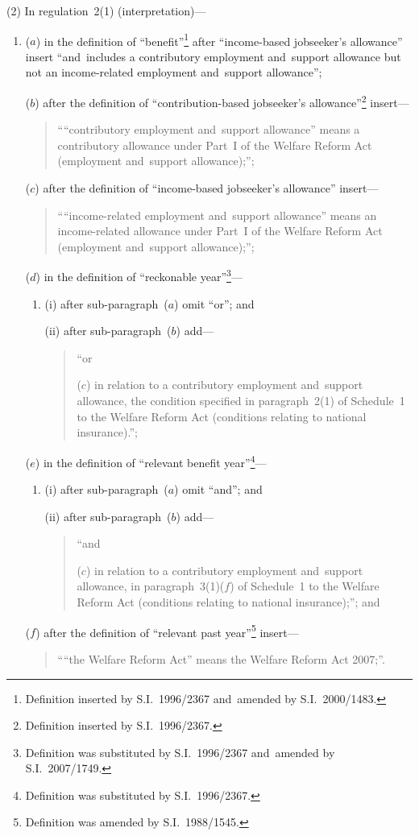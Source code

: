 \documentclass[12pt,a4paper]{article}
\begin{document}
(2) In regulation~2(1) (interpretation)—
\begin{enumerate}\item[]
($a$) in the definition of “benefit”\footnote{Definition inserted by S.I.~1996/2367 and~amended by S.I.~2000/1483.} after “income-based jobseeker’s allowance” insert “and~includes a contributory employment and~support allowance but not an income-related employment and~support allowance”;

($b$) after the definition of “contribution-based jobseeker’s allowance”\footnote{Definition inserted by S.I.~1996/2367.} insert—
\begin{quotation}
““contributory employment and~support allowance” means a contributory allowance under Part~I of the Welfare Reform Act (employment and~support allowance);”;
\end{quotation}

($c$) after the definition of “income-based jobseeker’s allowance” insert—
\begin{quotation}\sloppy
““income-related employment and~support allowance” means an income-related allowance under Part~I of the Welfare Reform Act (employment and~support allowance);”;
\end{quotation}

($d$) in the definition of “reckonable year”\footnote{Definition was substituted by S.I.~1996/2367 and~amended by S.I.~2007/1749.}—
\begin{enumerate}\item[]
(i) after sub-paragraph~($a$)  omit “or”; and

(ii) after sub-paragraph~($b$)  add—
\begin{quotation}
“or

($c$) in relation to a contributory employment and~support allowance, the condition specified in paragraph~2(1) of Schedule~1 to the Welfare Reform Act (conditions relating to national insurance).”;
\end{quotation}
\end{enumerate}

($e$) in the definition of “relevant benefit year”\footnote{Definition was substituted by S.I.~1996/2367.}—
\begin{enumerate}\item[]
(i) after sub-paragraph~($a$)  omit “and”; and

(ii) after sub-paragraph~($b$)  add—
\begin{quotation}
“and

($c$) in relation to a contributory employment and~support allowance, in paragraph~3(1)($f$)  of Schedule~1 to the Welfare Reform Act (conditions relating to national insurance);”; and
\end{quotation}
\end{enumerate}

($f$) after the definition of “relevant past year”\footnote{Definition was amended by S.I.~1988/1545.} insert—
\begin{quotation}
““the Welfare Reform Act” means the Welfare Reform Act 2007;”.
\end{quotation}
\end{enumerate}
\end{document}
